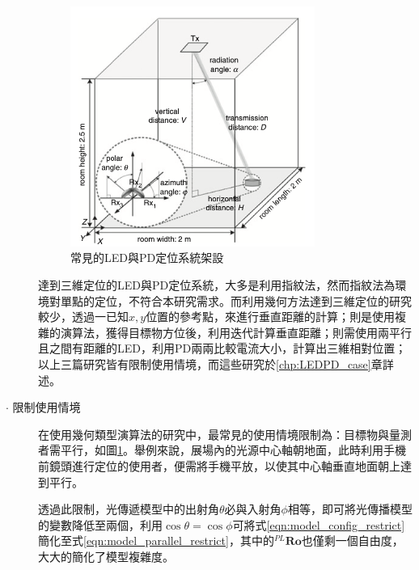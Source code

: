 \begin{description}
            \begin{figure}[h]
                \centering
                \includegraphics[width=8cm]{ch2pic/case_parallel.png}
                \caption{常見的LED與PD定位系統架設\cite{case:aoa}}
                \label{pic:case_parallel}
            \end{figure}
            
            達到三維定位的LED與PD定位系統，大多是利用指紋法\cite{case:ml}，然而指紋法為環境對單點的定位，不符合本研究需求。而利用幾何方法達到三維定位的研究較少，\cite{case:cart3d}透過一已知$x,y$位置的參考點，來進行垂直距離的計算；\cite{case:3d_layers}則是使用複雜的演算法，獲得目標物方位後，利用迭代計算垂直距離；\cite{case:hypercube}則需使用兩平行且之間有距離的LED，利用PD兩兩比較電流大小，計算出三維相對位置；以上三篇研究皆有限制使用情境，而這些研究於\ref{chp:LEDPD_case}章詳述。



            \item[$\cdot$ 限制使用情境]   \hfill
            
            \qquad
            在使用幾何類型演算法的研究中，最常見的使用情境限制為：目標物與量測者需平行，如圖\ref{pic:case_parallel}。舉例來說，展場內的光源中心軸朝地面，此時利用手機前鏡頭進行定位的使用者，便需將手機平放，以使其中心軸垂直地面朝上達到平行。

            \qquad
            透過此限制，光傳遞模型中的出射角$\theta$必與入射角$\phi$相等，即可將光傳播模型的變數降低至兩個，利用$\cos\theta=\cos\phi$可將式\ref{eqn:model_config_restrict}簡化至式\ref{eqn:model_parallel_restrict}，其中的$^{PL}\boldsymbol{Ro}$也僅剩一個自由度，大大的簡化了模型複雜度。



\end{description}
